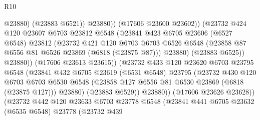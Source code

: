 \begin{lexlean}{R10}
\begin{coremodule}
                                      @23880)
                                    (@23883 @6521))
                                  @23880))
                              (@17606 @23600 @23602))
                            (@23732
                              @424
                              @120
                              @23607
                              @6703
                              @23812
                              @6548
                              (@23841
                                @423
                                @6705
                                @23606
                                (@6527 @6548)
                                @23812
                                (@23732
                                  @421
                                  @120
                                  @6703
                                  @6703
                                  @6526
                                  @6548
                                  (@23858 @87 @6556 @81 @6526 @23869 (@6818 (@23875 @87)))
                                  @23880)
                                (@23883 @6525))
                              @23880))
                          (@17606 @23613 @23615))
                        (@23732
                          @433
                          @120
                          @23620
                          @6703
                          @23795
                          @6548
                          (@23841
                            @432
                            @6705
                            @23619
                            (@6531 @6548)
                            @23795
                            (@23732
                              @430
                              @120
                              @6703
                              @6703
                              @6530
                              @6548
                              (@23858 @127 @6556 @81 @6530 @23869 (@6818 (@23875 @127)))
                              @23880)
                            (@23883 @6529))
                          @23880))
                      (@17606 @23626 @23628))
                    (@23732
                      @442
                      @120
                      @23633
                      @6703
                      @23778
                      @6548
                      (@23841
                        @441
                        @6705
                        @23632
                        (@6535 @6548)
                        @23778
                        (@23732
                          @439

\end{coremodule}
\end{lexlean}
